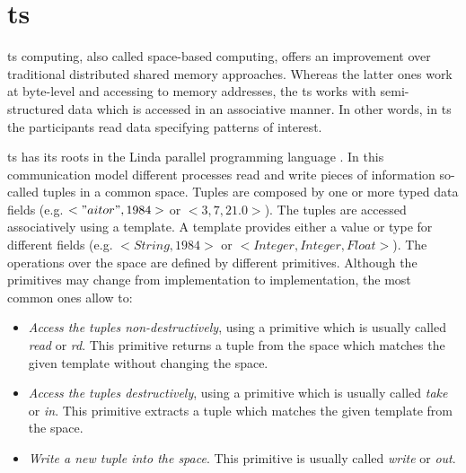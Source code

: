 \section{\acl{ts}}
\label{sec:tuplespaces_eoa}


\acf{ts} computing, also called space-based computing, offers an improvement over traditional distributed shared memory approaches.
Whereas the latter ones work at byte-level and accessing to memory addresses,
the \acl{ts} works with semi-structured data which is accessed in an associative manner.
In other words, in \ac{ts} the participants read data specifying patterns of interest.


\ac{ts} has its roots in the Linda parallel programming language \citep{gelernter_generative_1985}.
In this communication model different processes read and write pieces of information so-called tuples in a common space.
Tuples are composed by one or more typed data fields (e.g. $<"aitor",1984>$ or $<3,7,21.0>$).
The tuples are accessed associatively using a template.
A template provides either a value or type for different fields (e.g. $<String,1984>$ or $<Integer, Integer, Float>$).
The operations over the space are defined by different primitives.
Although the primitives may change from implementation to implementation, the most common ones allow to:

\begin{itemize}
  \item \emph{Access the tuples non-destructively}, using a primitive which is usually called \emph{read} or \emph{rd}.
	This primitive returns a tuple from the space which matches the given template without changing the space.
  \item \emph{Access the tuples destructively}, using a primitive which is usually called \emph{take} or \emph{in}.
	This primitive extracts a tuple which matches the given template from the space.
  \item \emph{Write a new tuple into the space}. This primitive is usually called \emph{write} or \emph{out}.
\end{itemize}